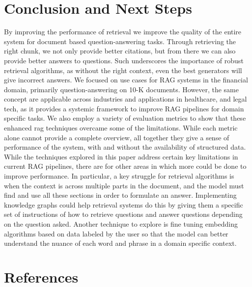 \documentclass{article}
\begin{document}
    \section{Conclusion and Next Steps}
    \noindent By improving the performance of retrieval we improve the quality of the entire system for document based question-answering tasks. Through retrieving the right chunk, we not only provide better citations, but from there we can also provide better answers to questions. Such underscores the importance of robust retrieval algorithms, as without the right context, even the best generators will give incorrect answers. We focused on use cases for RAG systems in the financial domain, primarily question-answering on 10-K documents. However, the same concept are applicable across industries and applications in healthcare, and legal tech, as it provides a systemic framework to improve RAG pipelines for domain specific tasks. We also employ a variety of evaluation metrics to show that these enhanced rag techniques overcame some of the limitations. While each metric alone cannot provide a complete overview, all together they give a sense of performance of the system, with and without the availability of structured data. 
    \\

    \noindent While the techniques explored in this paper address certain key limitations in current RAG pipelines, there are for other areas in which more could be done to improve performance. In particular, a key struggle for retrieval algorithms is when the context is across multiple parts in the document, and the model must find and use all these sections in order to formulate an answer. Implementing knowledge graphs could help retrieval systems do this by giving them a specific set of instructions of how to retrieve questions and answer questions depending on the question asked. Another technique to explore is fine tuning embedding algorithms based on data labeled by the user so that the model can better understand the nuance of each word and phrase in a domain specific context. 

 \pagebreak 
\section{References}

\end{document}
